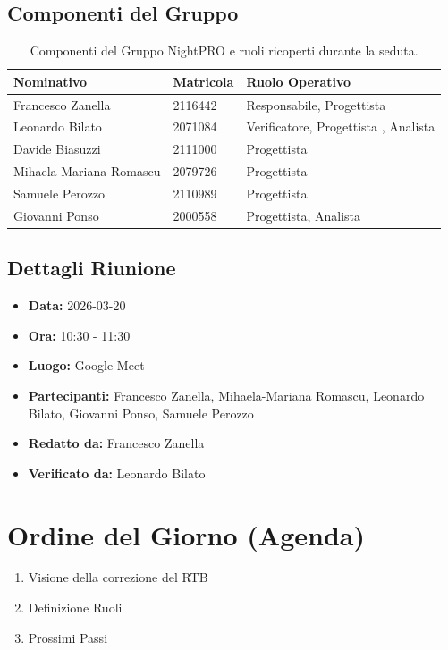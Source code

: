 \documentclass[a4paper, 11pt, oneside]{scrartcl} %
\begin{document}
\subsection{Componenti del Gruppo}
\begin{table}[h!]
\centering
\begin{tabular}{@{}lll@{}}
\toprule
\textbf{Nominativo} & \textbf{Matricola} & \textbf{Ruolo Operativo} \\
\midrule
Francesco Zanella & 2116442 & Responsabile, Progettista \\
Leonardo Bilato & 2071084 & Verificatore, Progettista , Analista\\
Davide Biasuzzi & 2111000 & Progettista \\
Mihaela-Mariana Romascu & 2079726 & Progettista \\
Samuele Perozzo & 2110989 & Progettista \\
Giovanni Ponso & 2000558 & Progettista, Analista \\
\bottomrule
\end{tabular}
\caption{Componenti del Gruppo NightPRO e ruoli ricoperti durante la seduta.}
\end{table}

\subsection{Dettagli Riunione}
\begin{itemize}
    \item \textbf{Data:} 2026-03-20
    \item \textbf{Ora:} 10:30 - 11:30
    \item \textbf{Luogo:} Google Meet
    \item \textbf{Partecipanti:} Francesco Zanella, Mihaela-Mariana Romascu, Leonardo Bilato, Giovanni Ponso, Samuele Perozzo
    \item \textbf{Redatto da:} Francesco Zanella
    \item \textbf{Verificato da:} Leonardo Bilato
\end{itemize}


\newpage
\section{Ordine del Giorno (Agenda)}
\begin{enumerate}
    \item Visione della correzione del RTB
    \item Definizione Ruoli
    \item Prossimi Passi
\end{enumerate}
\end{document}
